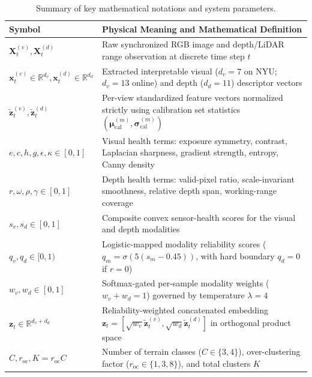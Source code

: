 \documentclass[11pt, a4paper]{article}
\begin{document}
\begin{table}[htbp]
    \centering
    \caption{Summary of key mathematical notations and system parameters.}
    \label{tab:nomenclature}
    \footnotesize
    \setlength{\tabcolsep}{4.5pt}
    \renewcommand{\arraystretch}{1.12}
    \begin{tabularx}{\textwidth}{l >{\raggedright\arraybackslash}X}
        \toprule
        \textbf{Symbol} & \textbf{Physical Meaning and Mathematical Definition} \\
        \midrule
        $\mathbf{X}_t^{(v)}, \mathbf{X}_t^{(d)}$ & Raw synchronized RGB image and depth/LiDAR range observation at discrete time step $t$ \\
        $\mathbf{x}_t^{(v)} \in \mathbb{R}^{d_v}, \mathbf{x}_t^{(d)} \in \mathbb{R}^{d_d}$ & Extracted interpretable visual ($d_v = 7$ on NYU; $d_v = 13$ online) and depth ($d_d = 11$) descriptor vectors \\
        $\tilde{\mathbf{z}}_t^{(v)}, \tilde{\mathbf{z}}_t^{(d)}$ & Per-view standardized feature vectors normalized strictly using calibration set statistics $(\bm{\mu}_{\text{cal}}^{(m)}, \bm{\sigma}_{\text{cal}}^{(m)})$ \\
        $e, c, h, g, \epsilon, \kappa \in [0,1]$ & Visual health terms: exposure symmetry, contrast, Laplacian sharpness, gradient strength, entropy, Canny density \\
        $r, \omega, \rho, \gamma \in [0,1]$ & Depth health terms: valid-pixel ratio, scale-invariant smoothness, relative depth span, working-range coverage \\
        $s_v, s_d \in [0,1]$ & Composite convex sensor-health scores for the visual and depth modalities \\
        $q_v, q_d \in [0,1)$ & Logistic-mapped modality reliability scores ($q_m = \sigma(5(s_m - 0.45))$, with hard boundary $q_d = 0$ if $r = 0$) \\
        $w_v, w_d \in [0,1]$ & Softmax-gated per-sample modality weights ($w_v + w_d = 1$) governed by temperature $\lambda = 4$ \\
        $\mathbf{z}_t \in \mathbb{R}^{d_v+d_d}$ & Reliability-weighted concatenated embedding $\mathbf{z}_t = [\sqrt{w_v}\tilde{\mathbf{z}}_t^{(v)}, \sqrt{w_d}\tilde{\mathbf{z}}_t^{(d)}]$ in orthogonal product space \\
        $C, r_{\text{oc}}, K = r_{\text{oc}}C$ & Number of terrain classes ($C \in \{3,4\}$), over-clustering factor ($r_{\text{oc}} \in \{1,3,8\}$), and total clusters $K$ \\

\end{tabularx}
\end{table}
\end{document}
